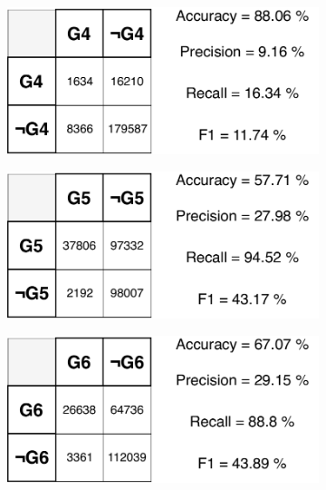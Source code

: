\begin{figure}[H]
\vspace{3mm}
\begin{subfigure}{.33\textwidth}
  \centering
  \includegraphics[width=\textwidth]{tex/images/results/rese_g4}  
\end{subfigure}%
\begin{subfigure}{.33\textwidth}
  \centering
  \includegraphics[width=\textwidth]{tex/images/results/rese_g5}
\end{subfigure}
\begin{subfigure}{.33\textwidth}
  \centering
  \includegraphics[width=\textwidth]{tex/images/results/rese_g6}
\end{subfigure}


\end{figure}
